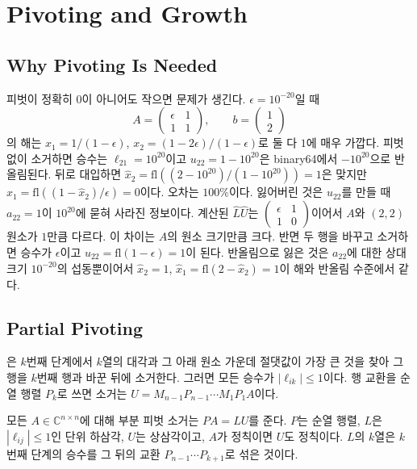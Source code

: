 \section{Pivoting and Growth}
\label{sec:lu-pivoting}

\subsection{Why Pivoting Is Needed}

피벗이 정확히 $0$이 아니어도 작으면 문제가 생긴다. $\epsilon=10^{-20}$일 때
\[
A=\begin{pmatrix}\epsilon&1\\1&1\end{pmatrix},\qquad b=\begin{pmatrix}1\\2\end{pmatrix}
\]
의 해는 $x_1=1/(1-\epsilon)$, $x_2=(1-2\epsilon)/(1-\epsilon)$로 둘 다 $1$에 매우 가깝다. 피벗 없이 소거하면 승수는 $\ell_{21}=10^{20}$이고 $u_{22}=1-10^{20}$은 binary64에서 $-10^{20}$으로 반올림된다. 뒤로 대입하면 $\hat x_2=\mathrm{fl}((2-10^{20})/(1-10^{20}))=1$은 맞지만 $\hat x_1=\mathrm{fl}((1-\hat x_2)/\epsilon)=0$이다. 오차는 $100\%$이다. 잃어버린 것은 $u_{22}$를 만들 때 $a_{22}=1$이 $10^{20}$에 묻혀 사라진 정보이다. 계산된 $\hat L\hat U$는 $\begin{pmatrix}\epsilon&1\\1&0\end{pmatrix}$이어서 $A$와 $(2,2)$ 원소가 $1$만큼 다르다. 이 차이는 $A$의 원소 크기만큼 크다. 반면 두 행을 바꾸고 소거하면 승수가 $\epsilon$이고 $u_{22}=\mathrm{fl}(1-\epsilon)=1$이 된다. 반올림으로 잃은 것은 $a_{22}$에 대한 상대 크기 $10^{-20}$의 섭동뿐이어서 $\hat x_2=1$, $\hat x_1=\mathrm{fl}(2-\hat x_2)=1$이 해와 반올림 수준에서 같다.

\subsection{Partial Pivoting}

은 $k$번째 단계에서 $k$열의 대각과 그 아래 원소 가운데 절댓값이 가장 큰 것을 찾아 그 행을 $k$번째 행과 바꾼 뒤에 소거한다. 그러면 모든 승수가 $|\ell_{ik}|\le1$이다. 행 교환을 순열 행렬 $P_k$로 쓰면 소거는 $U=M_{n-1}P_{n-1}\cdots M_1P_1A$이다.

\begin{theorem}
\label{thm:lu-partial-pivoting}
모든 $A\in\mathbb C^{n\times n}$에 대해 부분 피벗 소거는 $PA=LU$를 준다. $P$는 순열 행렬, $L$은 $|\ell_{ij}|\le1$인 단위 하삼각, $U$는 상삼각이고, $A$가 정칙이면 $U$도 정칙이다. $L$의 $k$열은 $k$번째 단계의 승수를 그 뒤의 교환 $P_{n-1}\cdots P_{k+1}$로 섞은 것이다.
\end{theorem}


